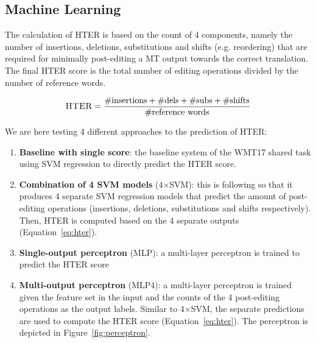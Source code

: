 \documentclass[11pt,letterpaper]{article}
\begin{document}
\subsection{Machine Learning}
\label{sec:methods:ml}

The calculation of HTER is based on the count of 4 components, namely the number
of insertions, deletions, substitutions and shifts (e.g. reordering) that are
required for minimally post-editing a MT output towards the correct translation.
The final HTER score is the total number of editing operations divided by the
number of reference words.

\begin{equation}
	\label{eq:hter}
	\textsc{HTER}=\frac{\textrm{\#insertions} + \textrm{\#dels} + \textrm{\#subs} + \textrm{\#shifts}}{\textrm{\#reference words}}
\end{equation}

We are here testing 4 different approaches to the prediction of HTER:
\begin{enumerate}
  \item {\bf Baseline with single score}: the baseline system of the
  WMT17 shared task using SVM regression
  \cite{basak2007support} to directly predict the HTER score.
  \item {\bf Combination of 4 SVM models} (4$\times$SVM): this is following
  \citet{avramidis:2014:W14-33} so that it produces 4 separate SVM regression
  models that predict the amount of post-editing operations
  (insertions, deletions, substitutions and shifts respectively). Then,
  HTER is computed based on the 4 separate outputs (Equation~\ref{eq:hter}).
  \item {\bf Single-output perceptron} (MLP): a multi-layer perceptron
  is trained to predict the HTER score
  \item {\bf Multi-output perceptron} (MLP4): a multi-layer perceptron is
  trained given the feature set in the input and the counts of the 4
  post-editing operations as the output labels. Similar to 4$\times$SVM, the separate predictions are used to compute the HTER score
  (Equation~\ref{eq:hter}). The perceptron is depicted in
  Figure~\ref{fig:perceptron}.
\end{enumerate}
\end{document}
